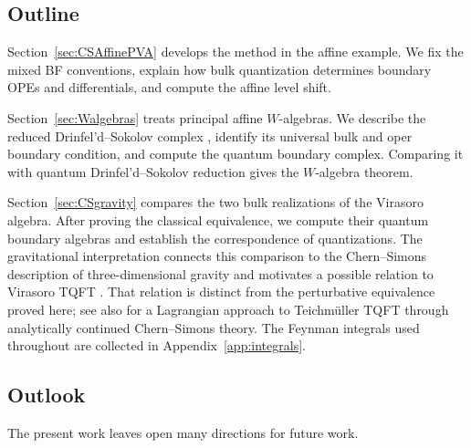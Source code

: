 \documentclass[11pt]{amsart}
\numberwithin{equation}{section}
\numberwithin{figure}{section}
\numberwithin{table}{section}
\begin{document}
\subsection{Outline}

Section~\ref{sec:CSAffinePVA} develops the method in the affine example.
We fix the mixed BF conventions, explain how bulk quantization determines boundary OPEs and differentials, and compute the affine level shift.

Section~\ref{sec:Walgebras} treats principal affine $W$-algebras.
We describe the reduced Drinfel'd--Sokolov complex \cite{Drinfeld:1985ds}, identify its universal bulk and oper boundary condition, and compute the quantum boundary complex.
Comparing it with quantum Drinfel'd--Sokolov reduction gives the $W$-algebra theorem.

Section~\ref{sec:CSgravity} compares the two bulk realizations of the Virasoro algebra.
After proving the classical equivalence, we compute their quantum boundary algebras and establish the correspondence of quantizations.
The gravitational interpretation connects this comparison to the Chern--Simons description of three-dimensional gravity \cite{Witten:1988hc} and motivates a possible relation to Virasoro TQFT \cite{Collier:2023fwi, Collier:2024mgv}.
That relation is distinct from the perturbative equivalence proved here; see also \cite{Mikhaylov:2017ngi} for a Lagrangian approach to Teichm\"{u}ller TQFT through analytically continued Chern--Simons theory.
The Feynman integrals used throughout are collected in Appendix~\ref{app:integrals}.

\subsection{Outlook}\label{sec:Outlook}

The present work leaves open many directions for future work.
\end{document}
